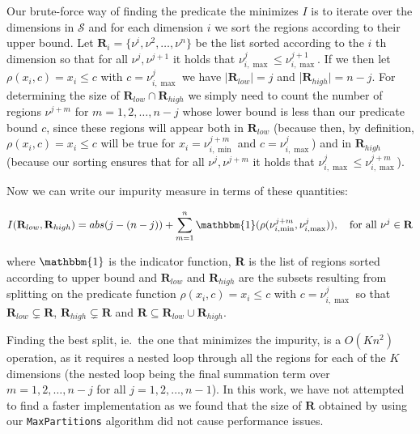 Our brute-force way of finding the predicate the minimizes $I$ is to iterate
over the dimensions in $\mathcal{S}$ and for each dimension $i$ we sort the
regions according to their upper bound. Let $\mathbf{R}_i = \{ \nu^i, \nu^2,
\ldots, \nu^n \}$ be the list sorted according to the $i$ th dimension so that
for all $\nu^j, \nu^{j+1}$ it holds that $\nu^{j}_{i,\max} \le
\nu^{j+1}_{i,\max}$. If we then let $\rho(x_i,c) = x_i \le c$ with $c =
\nu^{j}_{i,\max}$ we have $|\mathbf{R}_{low}| = j$ and |$\mathbf{R}_{high}| = n
- j$. For determining the size of $\mathbf{R}_{low} \cap \mathbf{R}_{high}$ we
simply need to count the number of regions $\nu^{j+m}$ for $m = 1, 2, \ldots,
n-j$ whose lower bound is less than our predicate bound $c$, since these regions
will appear both in $\mathbf{R}_{low}$ (because then, by definition, $\rho(x_i,c) = x_i
\le c$ will be true for $x_i = \nu^{j+m}_{i,\min}$ and $c = \nu^{j}_{i,\max}$)
and in $\mathbf{R}_{high}$ (because our sorting ensures that for all
$\nu^{j},\nu^{j+m}$ it holds that $\nu^{j}_{i,\max} \le \nu^{j+m}_{i,\max}$).

Now we can write our impurity measure in terms of these quantities:

\[
    I(\mathbf{R}_{low}, \mathbf{R}_{high}) = abs(j - (n - j)) +
    \sum^{n}_{m=1} \mathbbm{1}(\rho(\nu^{j+m}_{i,\min},\nu^{j}_{i,\max})), \quad
    \text{for all }\nu^{j} \in \mathbf{R}
\] 

where $\mathbbm{1}$ is the indicator function, $\mathbf{R}$ is the list of
regions sorted according to upper bound and $\mathbf{R}_{low}$ and
$\mathbf{R}_{high}$ are the subsets resulting from splitting on the predicate
function $\rho(x_i,c) = x_i \le c$ with $c = \nu^{j}_{i,\max}$ so that
$\mathbf{R}_{low} \subsetneq \mathbf{R}$, $\mathbf{R}_{high} \subsetneq
\mathbf{R}$ and $\mathbf{R} \subseteq \mathbf{R}_{low} \cup \mathbf{R}_{high}$.

Finding the best split, ie.\ the one that minimizes the impurity, is a $O(Kn^2)$
operation, as it requires a nested loop through all the regions for each
of the $K $dimensions (the nested loop being the final summation term over $m =
1, 2, \ldots, n - j$ for all $j = 1, 2, \ldots, n - 1$). In this work, we have
not attempted to find a faster implementation as we found that the size of
$\mathbf{R}$ obtained by using our \texttt{MaxPartitions} algorithm did not
cause performance issues.
